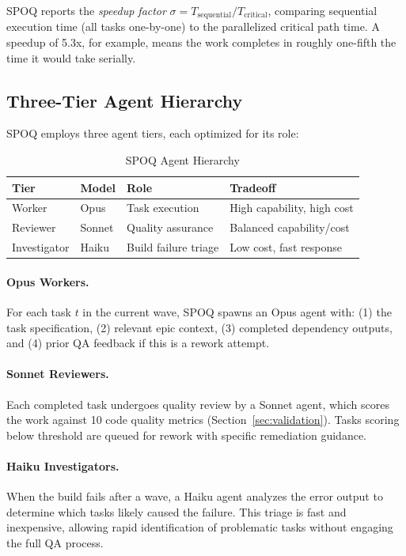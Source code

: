 SPOQ reports the \textit{speedup factor} $\sigma = T_{\text{sequential}} / T_{\text{critical}}$,
comparing sequential execution time (all tasks one-by-one) to the parallelized
critical path time. A speedup of 5.3x, for example, means the work completes
in roughly one-fifth the time it would take serially.

\subsection{Three-Tier Agent Hierarchy}
\label{subsec:agent-hierarchy}

SPOQ employs three agent tiers, each optimized for its role:

\begin{table}[H]
\centering
\caption{SPOQ Agent Hierarchy}
\label{tab:agents}
\begin{tabular}{llll}
\toprule
\textbf{Tier} & \textbf{Model} & \textbf{Role} & \textbf{Tradeoff} \\
\midrule
Worker & Opus & Task execution & High capability, high cost \\
Reviewer & Sonnet & Quality assurance & Balanced capability/cost \\
Investigator & Haiku & Build failure triage & Low cost, fast response \\
\bottomrule
\end{tabular}
\end{table}

\paragraph{Opus Workers.}
For each task $t$ in the current wave, SPOQ spawns an Opus agent with:
(1) the task specification, (2) relevant epic context, (3) completed dependency
outputs, and (4) prior QA feedback if this is a rework attempt.

\paragraph{Sonnet Reviewers.}
Each completed task undergoes quality review by a Sonnet agent, which scores
the work against 10 code quality metrics (Section~\ref{sec:validation}).
Tasks scoring below threshold are queued for rework with specific remediation
guidance.

\paragraph{Haiku Investigators.}
When the build fails after a wave, a Haiku agent analyzes the error output
to determine which tasks likely caused the failure. This triage is fast and
inexpensive, allowing rapid identification of problematic tasks without
engaging the full QA process.

